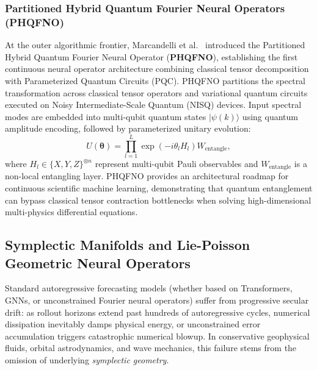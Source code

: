 \subsubsection{Partitioned Hybrid Quantum Fourier Neural Operators (PHQFNO)}
At the outer algorithmic frontier, Marcandelli et al.~\cite{marcandelli2025phqfno} introduced the Partitioned Hybrid Quantum Fourier Neural Operator (\textbf{PHQFNO}), establishing the first continuous neural operator architecture combining classical tensor decomposition with Parameterized Quantum Circuits (PQC). PHQFNO partitions the spectral transformation across classical tensor operators and variational quantum circuits executed on Noisy Intermediate-Scale Quantum (NISQ) devices. Input spectral modes are embedded into multi-qubit quantum states $|\psi(k)\rangle$ using quantum amplitude encoding, followed by parameterized unitary evolution:
\begin{equation}
    U(\boldsymbol{\theta}) = \prod_{l=1}^L \exp\left( -i \theta_l H_l \right) W_{\text{entangle}},
    \label{eq:quantum_operator}
\end{equation}
where $H_l \in \{X, Y, Z\}^{\otimes n}$ represent multi-qubit Pauli observables and $W_{\text{entangle}}$ is a non-local entangling layer. PHQFNO provides an architectural roadmap for continuous scientific machine learning, demonstrating that quantum entanglement can bypass classical tensor contraction bottlenecks when solving high-dimensional multi-physics differential equations.

\subsection{Symplectic Manifolds and Lie-Poisson Geometric Neural Operators}
\label{sec:symplectic_lie_poisson}
Standard autoregressive forecasting models (whether based on Transformers, GNNs, or unconstrained Fourier neural operators) suffer from progressive secular drift: as rollout horizons extend past hundreds of autoregressive cycles, numerical dissipation inevitably damps physical energy, or unconstrained error accumulation triggers catastrophic numerical blowup. In conservative geophysical fluids, orbital astrodynamics, and wave mechanics, this failure stems from the omission of underlying \textit{symplectic geometry}.

